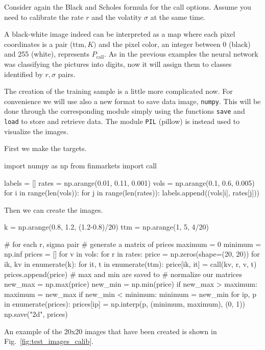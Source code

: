 Consider again the Black and Scholes formula for the call options.
Assume you need to calibrate the rate \(r\) and the volatity \(\sigma\)
at the same time.%

A black-white image indeed can be interpreted as a map where each pixel coordinates
is a pair (\(\mathrm{ttm}, K)\) and the pixel color, an integer between
0 (black) and 255 (white), represents \(P_\textrm{call}\). As in the
previous examples the neural network was classifying the pictures into
digits, now it will assign them to classes identified by \(r, \sigma\)
pairs.

The creation of the training sample is a little more complicated now.
For convenience we will use also a new format to save data image,
\texttt{numpy}. This will be done through the corresponding module
simply using the functions \texttt{save} and \texttt{load} to store and
retrieve data. The module \texttt{PIL} (pillow) is instead used to
visualize the images.

First we make the targets.

\begin{ipython}
import numpy as np
from finmarkets import call

labels = []
rates = np.arange(0.01, 0.11, 0.001)
vols = np.arange(0.1, 0.6, 0.005)
for i in range(len(vols)):
    for j in range(len(rates)):
        labels.append((vols[i], rates[j]))
\end{ipython}
\noindent
Then we can create the images.

\begin{ipython}
k = np.arange(0.8, 1.2, (1.2-0.8)/20)
ttm = np.arange(1, 5, 4/20)

# for each r, sigma pair
# generate a matrix of prices
maximum = 0
minimum = np.inf
prices = []
for v in vols:
    for r in rates:
        price = np.zeros(shape=(20, 20))
        for ik, kv in enumerate(k):
            for it, t in enumerate(ttm):
                price[ik, it] = call(kv, r, v, t)
                prices.append(price)
                # max and min are saved to
                # normalize our matrices
                new_max = np.max(price)
                new_min = np.min(price)
                if new_max > maximum:
                    maximum = new_max
                if new_min < minimum:
                    minimum = new_min
for ip, p in enumerate(prices):
    prices[ip] = np.interp(p, (minimum, maximum), (0, 1))
np.save("2d", prices)
\end{ipython}
\noindent
An example of the 20x20 images that have been created is shown in Fig.~\ref{fig:test_images_calib}.

